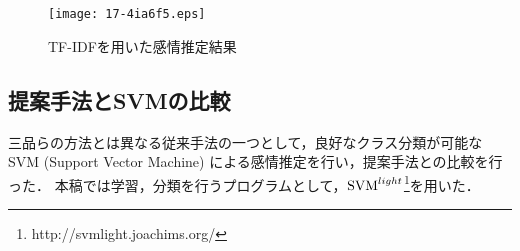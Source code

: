 \documentclass[japanese]{jnlp_1.4}
\def\resp#1{}
\def\respeqn#1{}
\def\ngram{}
\begin{document}
\resp{FPの有効性を確認するため，FPのかわりにTF-IDFを用いた実験を行った．
ここでは，TF-IDFをFPと同様，0から1の範囲の値とするため，
{\it tf}値として拡大正規化索引語頻度{\cite{kita2}}を用い，また{\it idf}値も
通常の{\it idf}値{\cite{jones}}を式 ({\ref{eq:idf-norm}}) を用いて正規化し，
下記のような計算式によるTF-IDF値を用いた．}
\begin{align}
\respeqn{
sim_{\rm TFIDF}(x,s)} & \respeqn{=} \respeqn{{\rm BP} \cdot \frac{1}{\rm N} \sum^{\rm N}_{n=1}{tfidf}_{n} \cdot p_{n}(x,s)} \\
\respeqn{
tfidf_{n} } & \respeqn{=} \respeqn{\frac{1}{\left|G_{n}(x)\right|}\sum_{\ngram \in
  G_{n}(x)}{tf_{n} \cdot idf_{n}} }\\
\respeqn{
tf_{n}} & \respeqn{=} \respeqn{ \left\{
	  \begin{array}{lll}
	   0.5 + 0.5 \cdot \frac{\displaystyle freq_{C_{e}(w_{n})}}{\displaystyle
	    \max_{c \in C}freq_{c}(w_{n})} & {\rm if} &
	    freq_{C_{e}}(w_{n}) > 0 \\
	   0 & {\rm if} & freq_{C_{e}}(w_{n}) = 0  
	 \end{array} \right. } \\
\respeqn{
idf_{n} } & \respeqn{=} \respeqn{ \left\{
	   \begin{array}{lll}
	    \frac{\log \frac{|C|}{D(w_{n})} + 1}{\log |C| + 1} & {\rm
	     if} & D(w_{n}) > 0 \\
	    0 & {\rm if} & D(w_{n}) = 0
	   \end{array}
\right . \label{eq:idf-norm}} 
\end{align}
\resp{ここで{$D(w_{n})$}は{$w_{n}$}を含むコーパスの数を返す関数である．}

\begin{figure}[b]
 \begin{center}
  \texttt{[image: 17-4ia6f5.eps]}
 \end{center}
 \caption{TF-IDFを用いた感情推定結果}
 \label{fig:tf-idf}
\end{figure}


\resp{TF-IDFを用いた感情推定実験の結果を図{\ref{fig:tf-idf}}に示す．
この結果を見ると，すべてのNにおいてFPのほうが2.5ポイント〜8ポイント
程度上まわっており，FPの有効性が認められた．}




\subsection{提案手法とSVMの比較}
三品らの方法とは異なる従来手法の一つとして，良好なクラス分類が可能なSVM (Support
Vector Machine) による感情推定を行い，提案手法との比較を行った．
本稿では学習，分類を行うプログラムとして，${\rm SVM}^{light}$\footnote{http://svmlight.joachims.org/}を用いた．
\end{document}
